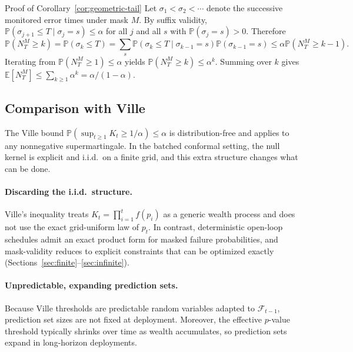 \documentclass{uai2026} %
\newcommand{\1}{\mathbf{1}}
\newcommand{\prob}{\mathbb{P}}
\newcommand{\expec}{\mathbb{E}}
\newcommand{\F}{\mathcal{F}}
\newcommand{\K}{K}
\begin{document}
\begin{appendixproof}{Proof of Corollary~\ref{cor:geometric-tail}}
  Let $\sigma_{1}<\sigma_{2}<\cdots$ denote the successive monitored error times under mask $M$.
  By suffix validity, $\prob(\sigma_{j+1}\le T\mid\sigma_{j}=s)\le\alpha$ for all $j$ and all $s$ with $\prob(\sigma_{j}=s)>0$.
  Therefore
  \begin{equation*}
    \prob(N_{T}^{M}\ge k)=\prob(\sigma_{k}\le T)=\sum_{s}\prob(\sigma_{k}\le T\mid\sigma_{k-1}=s)\prob(\sigma_{k-1}=s)\le\alpha\prob(N_{T}^{M}\ge k-1).
  \end{equation*}
  Iterating from $\prob(N_{T}^{M}\ge 1)\le\alpha$ yields $\prob(N_{T}^{M}\ge k)\le\alpha^{k}$.
  Summing over $k$ gives $\expec[N_{T}^{M}]\le\sum_{k\ge 1}\alpha^{k}=\alpha/(1-\alpha)$.
\end{appendixproof}

\subsection{Comparison with Ville}
\label{sec:ville-compare}

The Ville bound $\prob(\sup_{t\ge 1}\K_{t}\ge 1/\alpha)\le\alpha$ is distribution-free and applies to any nonnegative supermartingale.
In the batched conformal setting, the null kernel is explicit and i.i.d.\ on a finite grid, and this extra structure changes what can be done.

\paragraph{Discarding the i.i.d.\ structure.}
Ville's inequality treats $\K_{t}=\prod_{i=1}^{t} f(p_{i})$ as a generic wealth process and does not use the exact grid-uniform law of $p_{t}$.
In contrast, deterministic open-loop schedules admit an exact product form for masked failure probabilities, and mask-validity reduces to explicit constraints that can be optimized exactly (Sections~\ref{sec:finite}--\ref{sec:infinite}).

\paragraph{Unpredictable, expanding prediction sets.}
Because Ville thresholds are predictable random variables adapted to $\F_{t-1}$, prediction set sizes are not fixed at deployment.
Moreover, the effective $p$-value threshold typically shrinks over time as wealth accumulates, so prediction sets expand in long-horizon deployments.
\end{document}
